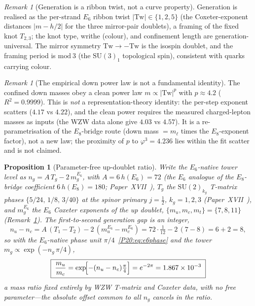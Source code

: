 \documentclass[11pt,a4paper]{article}
\newtheorem{proposition}[theorem]{Proposition}
\theoremstyle{definition}\newtheorem{definition}[theorem]{Definition}
\theoremstyle{remark}
\newtheorem{remark}[theorem]{Remark}
\newcommand{\vp}{\varphi}
\newcommand{\SU}{\mathrm{SU}}
\newcommand{\Tw}{\mathrm{Tw}}
\begin{document}
\begin{remark}[Generation is a ribbon twist, not a curve property]
\label{P20:rem:twist}
Generation is realised as the per-strand $E_6$ ribbon twist $|\Tw|\in
\{1,2,5\}$ (the Coxeter-exponent distances $|m-h/2|$ for the three
mirror-pair doublets), a framing of the fixed knot $T_{2,3}$; the knot
type, writhe (colour), and confinement length are generation-universal.
The mirror symmetry $\Tw\to-\Tw$ is the isospin doublet, and the
framing period is $\mathrm{mod}\ 3$ (the $\SU(3)_1$ topological spin),
consistent with quarks carrying colour.
\end{remark}

\begin{remark}[The empirical down power law is not a fundamental identity]
\label{P20:rem:powerlaw}
The confined down masses obey a clean power law $m\propto|\Tw|^{p}$ with
$p\approx4.2$ ($R^2=0.9999$). This is \emph{not} a representation-theory
identity: the per-step exponent scatters ($4.17$ vs $4.22$), and the
clean power requires the measured charged-lepton masses as inputs (the
WZW data alone give $4.03$ vs $4.57$). It is a re-parametrisation of the
$E_8$-bridge route (down mass $=m_\ell$ times the $E_8$-exponent
factor), not a new law; the proximity of $p$ to $\vp^3=4.236$ lies
within the fit scatter and is not claimed.
\end{remark}

\begin{proposition}[Parameter-free up-doublet ratio]
\label{P20:prop:up_ratio}
Write the $E_6$-native tower level as $n_g=A\,T_g-2\,m_g^{E_6}$, with
$A=6\,h(E_6)=72$ (the $E_6$ analogue of the $E_8$-bridge coefficient
$6\,h(E_8)=180$; Paper~XVII~\cite{Paper17}), $T_g$ the $\SU(2)_{k_g}$
T-matrix phases $\{5/24,\,1/8,\,3/40\}$ at the spinor primary $j=\tfrac12$,
$k_g=1,2,3$ (Paper~XVII~\cite{Paper17}), and $m_g^{E_6}$ the $E_6$ Coxeter
exponents of the up doublet, $\{m_u,m_c,m_t\}=\{7,8,11\}$
(Remark~\ref{P20:rem:twist}). The first-to-second generation gap is an
integer,
\begin{equation}
  n_u-n_c=A\,(T_1-T_2)-2\,(m_u^{E_6}-m_c^{E_6})
        =72\cdot\tfrac{1}{12}-2\,(7-8)=6+2=8,
  \label{P20:eq:up_gap}
\end{equation}
so with the $E_6$-native phase unit $\pi/4$~\eqref{P20:eq:e6phase} and the
tower $m_g\propto\exp(-n_g\,\pi/4)$,
\begin{equation}
  \boxed{\;\frac{m_u}{m_c}=\exp\!\Bigl[-(n_u-n_c)\tfrac{\pi}{4}\Bigr]
                =e^{-2\pi}=1.867\times10^{-3}\;}
  \label{P20:eq:up_ratio}
\end{equation}
a mass ratio fixed entirely by WZW T-matrix and Coxeter data, with no free
parameter---the absolute offset common to all $n_g$ cancels in the ratio.
\end{proposition}
\end{document}
